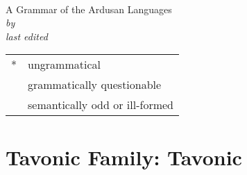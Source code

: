 \documentclass[12pt,letterpaper,openany,twoside]{memoir}
\title{\landn}
\author{Ian A.~Cook}
\date{\today}
\makeatletter
\let\originalpart=\part
\def\part{\cleardoublepage\originalpart}
\newcommand{\ungr}{*}
\newcommand{\ques}{\fakesuperscript{?}}
\newcommand{\excl}{\fakesuperscript{!}}
\newcommand{\landadj}{Ardusan}
\newcommand{\subtitle}{A Grammar of the \landadj{} Languages}
\newcommand{\Titlep}{%
	\begingroup
	\centering
	{\Huge \@title}\\[\baselineskip]
	{\LARGE\textsc \subtitle{}}\\[\baselineskip]
	{\Large\textit{by \@author}}\\
	\vfill
	\textit{last edited}\\
	{\large \@date}\par
	\endgroup
}
\makeatother
\begin{document}

\begin{titlingpage}
	\Titlep{}
	\clearpage
	
\end{titlingpage}


\frontmatter
{}\label{cha:toc}
\tableofcontents*
\clearpage
\listoffigures\label{cha:figures}
\clearpage
\listoftables\label{cha:tables}
\clearpage
\printglosses\label{cha:glossary}
\bigskip
\noindent\begin{tabular}{@{} l l}
\ungr & ungrammatical\\
\ques & grammatically questionable\\
\excl & semantically odd or ill-formed\\
\end{tabular}
\clearpage








\mainmatter

\part{Tavonic Family: Tavonic}
















\end{document}
